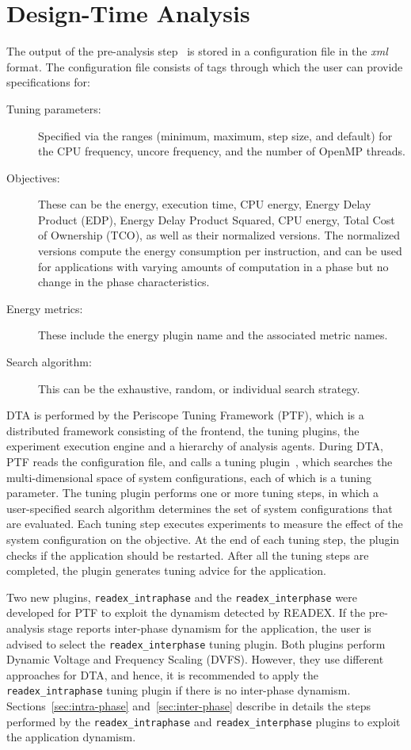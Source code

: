 \section{Design-Time Analysis} \label{sec:dta}
The output of the pre-analysis step~\cite{kumaraswamy2018design} is stored in a configuration file in the \textit{xml} format. The configuration file consists of tags through which the user can provide specifications for:
\begin{description}
	\item [Tuning parameters:] Specified via the ranges (minimum, maximum, step size, and default) for the CPU frequency, uncore frequency, and the number of OpenMP threads.
	\item [Objectives:] These can be the energy, execution time, CPU energy, Energy Delay Product (EDP), Energy Delay Product Squared, CPU energy, Total Cost of Ownership (TCO), as well as their normalized versions. The normalized versions compute the energy consumption per instruction, and can be used for applications with varying amounts of computation in a phase but no change in the phase characteristics.
	\item [Energy metrics:] These include the energy plugin name and the associated metric names. 
	\item [Search algorithm:] This can be the exhaustive, random, or individual search strategy.
\end{description}

DTA is performed by the Periscope Tuning Framework (PTF), which is a distributed framework consisting of the frontend, the tuning plugins, the experiment execution engine and a hierarchy of analysis agents. During DTA, PTF reads the configuration file, and calls a tuning plugin~\cite{AutoTune:Book2015}, which searches the multi-dimensional space of system configurations, each of which is a tuning parameter. The tuning plugin performs one or more tuning steps, in which a user-specified search algorithm determines the set of system configurations that are evaluated. Each tuning step executes experiments to measure the effect of the system configuration on the objective. At the end of each tuning step, the plugin checks if the application should be restarted. After all the tuning steps are completed, the plugin generates tuning advice for the application.

Two new plugins, \texttt{readex\_intraphase} and the \texttt{readex\_interphase} were developed for PTF to exploit the dynamism detected by READEX. If the pre-analysis stage reports inter-phase dynamism for the application, the user is advised to select the \texttt{readex\_interphase} tuning plugin. Both plugins perform Dynamic Voltage and Frequency Scaling (DVFS). However, they use different approaches for DTA, and hence, it is recommended to apply the \linebreak\texttt{readex\_intraphase} tuning plugin if there is no inter-phase dynamism. Sections~\ref{sec:intra-phase} and~\ref{sec:inter-phase} describe in details the steps performed by the \linebreak\texttt{readex\_intraphase} and \texttt{readex\_interphase} plugins to exploit the application dynamism.


